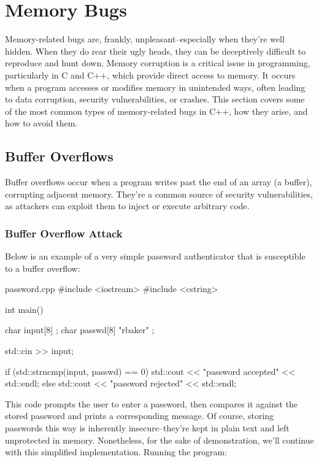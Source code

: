 \documentclass[12pt]{article}
\begin{document}
\tableofcontents

\pagebreak

\section{Memory Bugs}

\noindent
Memory-related bugs are, frankly, unpleasant--especially when they're well hidden.
When they do rear their ugly heads, they can be deceptively difficult to reproduce and hunt down.
Memory corruption is a critical issue in programming, particularly in C and C++, which provide direct access to memory.
It occurs when a program accesses or modifies memory in unintended ways, often leading to data corruption, security vulnerabilities, or crashes.
This section covers some of the most common types of memory-related bugs in C++, how they arise, and how to avoid them.

\subsection{Buffer Overflows}

\noindent
Buffer overflows occur when a program writes past the end of an array (a buffer), corrupting adjacent memory.
They’re a common source of security vulnerabilities, as attackers can exploit them to inject or execute arbitrary code.

\subsubsection{Buffer Overflow Attack}

\noindent
Below is an example of a very simple password authenticator that is susceptible to a buffer overflow:

\begin{cxx}{password.cpp}
#include <iostream>
#include <cstring>

int main()
{
	char input[8] {};
	char passwd[8] { "rbaker" };

	std::cin >> input;

	if (std::strncmp(input, passwd) == 0)
	{
		std::cout << "password accepted" << std::endl;
	}
	else
	{
		std::cout << "password rejected" << std::endl;
	}
}
\end{cxx}

\noindent
This code prompts the user to enter a password, then compares it against the stored password and prints a corresponding message.
Of course, storing passwords this way is inherently insecure--they're kept in plain text and left unprotected in memory.
Nonetheless, for the sake of demonstration, we’ll continue with this simplified implementation.
Running the program:
\end{document}

